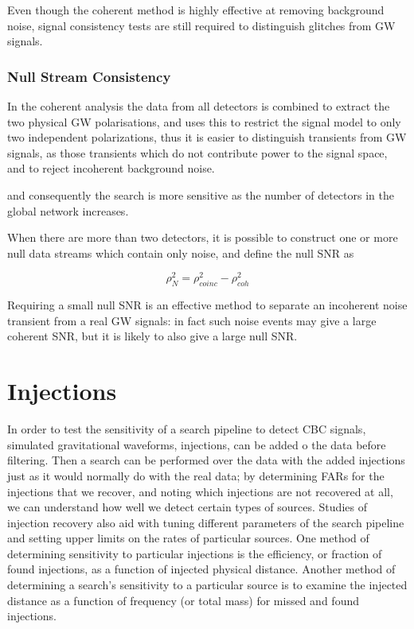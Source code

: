 \documentclass[binding=0.6cm, LaM]{sapthesis}
\begin{document}
	 Even though the coherent method is highly effective at removing background noise,  
	signal consistency tests are still required to distinguish glitches from GW signals. 

\subsubsection{Null Stream Consistency}

	In the coherent analysis the data from all detectors 
	is combined to extract the two physical GW polarisations, 
	and uses this to restrict the signal model to 
	only two independent polarizations, 
	thus it is easier to distinguish transients from GW signals, 
	as those transients which do not contribute power to the signal space, and to reject incoherent background noise. 
	

	and consequently the search is more sensitive as the number of detectors in the global network increases.

        When there are more than two detectors, 
	it is possible to construct one or more null data streams 
	which contain only noise, and define the null SNR as

		\begin{equation}
			\rho^2_N = \rho^2_{coinc} - \rho^2_{coh} 
		\end{equation}

	 
	Requiring a small null SNR is an effective method to separate 
	an incoherent noise transient from a real GW signals: 
	in fact such noise events may give a large coherent SNR,
	 but it is likely to also give a large null SNR.       

\section{Injections}

	In order to test the sensitivity of a search pipeline to detect CBC signals, 
	simulated gravitational waveforms, injections, can be added o the data before filtering.
	Then a search can be performed over the data with the added injections just as it would normally do with the real data;
	by determining FARs for the injections that we recover, 	
	and noting which injections are not recovered at all,
	we can understand how well we detect certain types of sources.
	Studies of injection recovery also aid with tuning different parameters 
	of the search pipeline and setting upper limits on the rates of particular sources. 
	One method of determining sensitivity to particular injections is the efficiency, 
	or fraction of found injections, as a function of injected physical distance. 
	Another method of determining a search’s sensitivity to a particular source 
	is to examine the injected distance as a function of frequency 
	(or total mass) for missed and found injections. 
	
\end{document}
